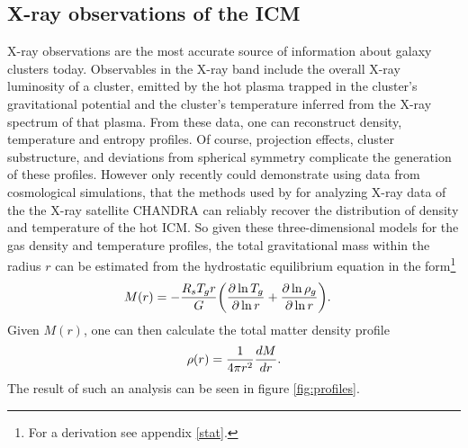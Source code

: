 \subsection{X-ray observations of the ICM}
X-ray observations are the most accurate source of information about galaxy
clusters today. Observables in the X-ray band include the overall X-ray
luminosity of a cluster, emitted by the hot plasma trapped
in the cluster’s gravitational potential and the cluster’s temperature inferred
from the X-ray spectrum of that plasma. From these data, one can reconstruct
density, temperature and entropy profiles. Of course, projection effects,
cluster substructure, and deviations from spherical symmetry complicate the
generation of these profiles. However only recently \citet{Nagai2007}
could demonstrate using data from cosmological simulations, that the methods
used by \citet{Vikhlinin2006} for analyzing X-ray data of the the
X-ray satellite CHANDRA can reliably recover the distribution of density and
temperature of the hot ICM.  So given these three-dimensional models for the gas
density and temperature profiles, the total gravitational mass within the radius
$r$ can be estimated from the hydrostatic equilibrium equation in the
form\footnote{For a derivation see appendix \ref{stat}.} 
\begin{align}
M(r) &= - \frac{R_s T_g r}{G} \lra{\ppd{\ln r}{\ln T_g}+\ppd{\ln r}{\ln
\rho_g}}.
\end{align}
Given $M(r)$, one can then calculate the total
matter density profile
\begin{align}
\rho(r)=\frac{1}{4\pi r^2} \ttd{r}{M}. 
\end{align}
The result of such an analysis \citep{Vikhlinin2006} can be seen in figure
\ref{fig:profiles}. 

